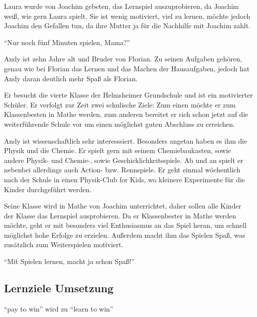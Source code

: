 \begin{description}
\begin{description}
			\item[Motivation]{Laura wurde von Joachim gebeten, das Lernspiel auszuprobieren, da Joachim weiß, wie gern Laura spielt. Sie ist wenig motiviert, viel zu lernen, möchte jedoch Joachim den Gefallen tun, da ihre Mutter ja für die Nachhilfe mit Joachim zahlt.}
			\item{\enquote{Nur noch fünf Minuten spielen, Mama?}}
		\end{description}
		\item[Andy Klein: Der Experte]\hfill
		\begin{description}
			\item[Familiäres Umfeld]{Andy ist zehn Jahre alt und Bruder von Florian. Zu seinen Aufgaben gehören, genau wie bei Florian das Lernen und das Machen der Hausaufgaben, jedoch hat Andy daran deutlich mehr Spaß als Florian.}
			\item[Schulisches Umfeld]{Er besucht die vierte Klasse der Helmsheimer Grundschule und ist ein motivierter Schüler. Er verfolgt zur Zeit zwei schulische Ziele: Zum einen möchte er zum Klassenbesten in Mathe werden, zum anderen bereitet er sich schon jetzt auf die weiterführende Schule vor um einen möglichst guten Abschluss zu erreichen. }
			\item[Interessen und Hobbys]{Andy ist wissenschaftlich sehr interesssiert. Besonders angetan haben es ihm die Physik und die Chemie. Er spielt gern mit seinem Chemiebaukasten, sowie andere Physik- und Chemie-, sowie Geschicklichkeitsspiele. Ab und an spielt er nebenbei allerdings auch Action- bzw. Rennspiele. Er geht einmal wöchentlich nach der Schule in einen Physik-Club for Kids, wo kleinere Experimente für die Kinder durchgeführt werden.}
			\item[Motivation]{Seine Klasse wird in Mathe von Joachim unterrichtet, daher sollen alle Kinder der Klasse das Lernspiel ausprobieren. Da er Klassenbester in Mathe werden möchte, geht er mit besonders viel Enthusiasmus an das Spiel heran, um schnell möglichst hohe Erfolge zu erzielen. Außerdem macht ihm das Spielen Spaß, was zusätzlich zum Weiterspielen motiviert.}
			\item{\enquote{Mit Spielen lernen, macht ja schon Spaß!}}
		\end{description}
	\end{description}
\subsection{Lernziele Umsetzung}
	\enquote{pay to win} wird zu \enquote{learn to win}
